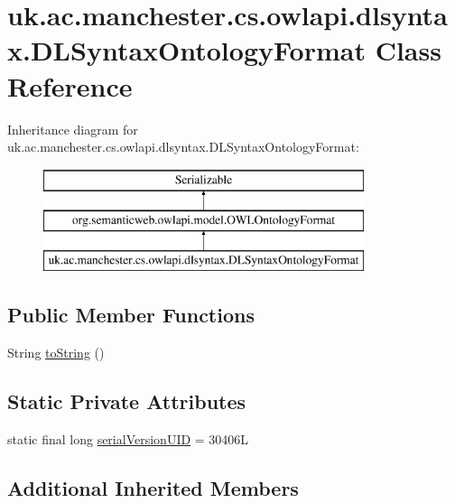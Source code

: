 \hypertarget{classuk_1_1ac_1_1manchester_1_1cs_1_1owlapi_1_1dlsyntax_1_1_d_l_syntax_ontology_format}{\section{uk.\-ac.\-manchester.\-cs.\-owlapi.\-dlsyntax.\-D\-L\-Syntax\-Ontology\-Format Class Reference}
\label{classuk_1_1ac_1_1manchester_1_1cs_1_1owlapi_1_1dlsyntax_1_1_d_l_syntax_ontology_format}
}
Inheritance diagram for uk.\-ac.\-manchester.\-cs.\-owlapi.\-dlsyntax.\-D\-L\-Syntax\-Ontology\-Format\-:\begin{figure}[H]
\begin{center}
\leavevmode
\includegraphics[height=3.000000cm]{classuk_1_1ac_1_1manchester_1_1cs_1_1owlapi_1_1dlsyntax_1_1_d_l_syntax_ontology_format}
\end{center}
\end{figure}
\subsection*{Public Member Functions}
\begin{DoxyCompactItemize}
\item 
String \hyperlink{classuk_1_1ac_1_1manchester_1_1cs_1_1owlapi_1_1dlsyntax_1_1_d_l_syntax_ontology_format_a992f948424e818c1c0d0a8f5eae9e503}{to\-String} ()
\end{DoxyCompactItemize}
\subsection*{Static Private Attributes}
\begin{DoxyCompactItemize}
\item 
static final long \hyperlink{classuk_1_1ac_1_1manchester_1_1cs_1_1owlapi_1_1dlsyntax_1_1_d_l_syntax_ontology_format_a7462244caf2cabe47e783f44c2033fe6}{serial\-Version\-U\-I\-D} = 30406\-L
\end{DoxyCompactItemize}
\subsection*{Additional Inherited Members}


